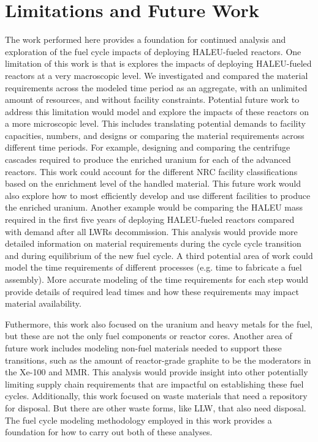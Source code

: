 \section{Limitations and Future Work}
The work performed here provides a foundation for continued analysis and 
exploration of the fuel cycle impacts of deploying \gls{HALEU}-fueled reactors. 
One limitation of this work is that is explores the impacts of 
deploying \gls{HALEU}-fueled reactors at a very macroscopic level. 
We investigated and compared the material requirements across the 
modeled time period as an aggregate, with an unlimited amount 
of resources, and without facility constraints.
Potential future work to address this limitation would model and 
explore the impacts of these reactors on a more microscopic level. 
This includes translating potential demands to facility capacities, 
numbers, and designs or comparing the material requirements across 
different time periods. For example, designing and comparing the 
centrifuge cascades required to produce the enriched uranium for 
each of the advanced reactors. This work could account for the 
different \gls{NRC} facility classifications based on the 
enrichment level of the handled material. This future work 
would also explore how to 
most efficiently develop and use different facilities to produce the 
enriched uranium. Another example would be comparing the \gls{HALEU} mass 
required in the first five years of deploying \gls{HALEU}-fueled 
reactors compared with demand after all \glspl{LWR} decommission. This 
analysis would provide more detailed information on material requirements 
during the cycle cycle transition and during equilibrium of the new 
fuel cycle. A third potential area of work could model the time requirements 
of different processes (e.g. time to fabricate a fuel assembly). 
More accurate modeling of the time requirements for each step would 
provide details of required lead times and how these requirements 
may impact material availability. 

Futhermore, this work also focused on the uranium and heavy metals for 
the fuel, but these are not the only fuel components or reactor 
cores. Another area of future work includes modeling non-fuel 
materials needed to support these transitions, such as the amount 
of reactor-grade graphite 
to be the moderators in the Xe-100 and \gls{MMR}. This analysis would 
provide insight into other potentially limiting supply chain 
requirements that are  
impactful on establishing these fuel cycles. Additionally, this work 
focused on waste materials that need a repository for disposal. 
But there are other waste forms, like \acrfull{LLW}, that also need 
disposal. The fuel cycle modeling 
methodology employed in this work provides a foundation 
for how to carry out both of these analyses. 

